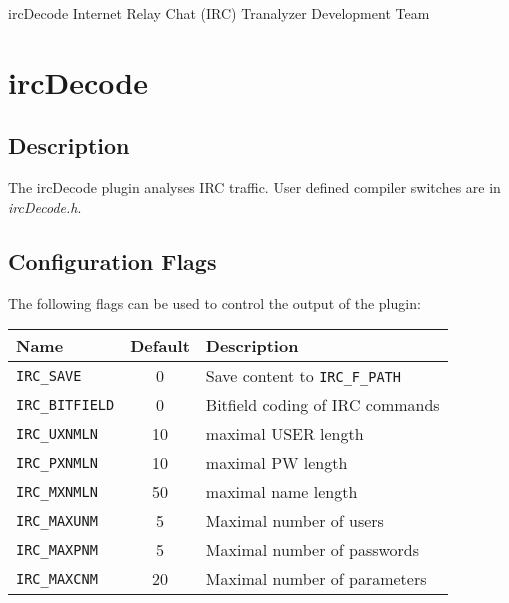 \documentclass[documentation]{subfiles}
\begin{document}
\trantitle
    {ircDecode}
    {Internet Relay Chat (IRC)}
    {Tranalyzer Development Team} %

\section{ircDecode}\label{s:ircDecode}

\subsection{Description}
The ircDecode plugin analyses IRC traffic. User defined compiler switches are in {\em ircDecode.h}.

\subsection{Configuration Flags}
The following flags can be used to control the output of the plugin:
\begin{longtable}{lcl}
    \toprule
    {\bf Name} & {\bf Default} & {\bf Description}\\
    \midrule\endhead%
    {\tt IRC\_SAVE}     &  0 & Save content to {\tt\small IRC\_F\_PATH}\\
    {\tt IRC\_BITFIELD} &  0 & Bitfield coding of IRC commands\\
    {\tt IRC\_UXNMLN}   & 10 & maximal USER length\\
    {\tt IRC\_PXNMLN}   & 10 & maximal PW length\\
    {\tt IRC\_MXNMLN}   & 50 & maximal name length\\
    {\tt IRC\_MAXUNM}   &  5 & Maximal number of users\\
    {\tt IRC\_MAXPNM}   &  5 & Maximal number of passwords\\
    {\tt IRC\_MAXCNM}   & 20 & Maximal number of parameters\\
    \bottomrule
\end{longtable}
\end{document}
